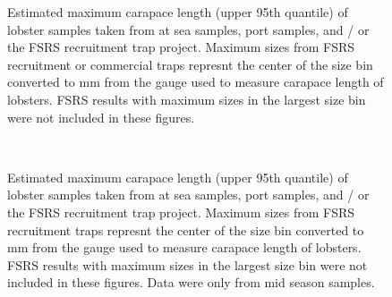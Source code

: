 \documentclass[11pt]{article}
\newcommand{\D}{.}
\newcommand{\e}{/backup/bio_data/bio.lobster/figures/} %
\begin{document}
\begin{landscape}
\begin{figure}
                    \caption{Estimated maximum carapace length (upper 95th quantile) of lobster samples taken from at sea samples, port samples, and / or the FSRS recruitment trap project. Maximum sizes from FSRS recruitment or commercial traps represnt the center of the size bin converted to mm from the gauge used to measure carapace length of lobsters. FSRS results with maximum sizes in the largest size bin were not included in these figures.}
        \end{figure}

\end{landscape}



\begin{landscape}
\begin{figure}
        \centering
         \\
                    
                    \caption{Estimated maximum carapace length (upper 95th quantile) of lobster samples taken from at sea samples, port samples, and / or the FSRS recruitment trap project. Maximum sizes from FSRS recruitment traps represnt the center of the size bin converted to mm from the gauge used to measure carapace length of lobsters. FSRS results with maximum sizes in the largest size bin were not included in these figures. Data were only from mid season samples.}
        \end{figure}

\begin{figure}
        \centering
         \\
                    

\end{figure}
\end{landscape}
\end{document}
